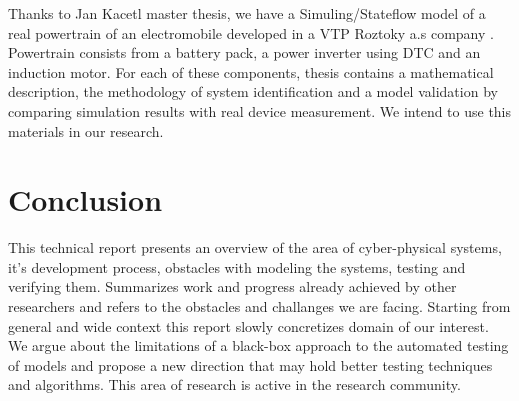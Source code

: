 \documentclass[english,technical,10pt]{FITreport}[2018/01/26]
\begin{document}
Thanks to Jan Kacetl master thesis, we have a Simuling/Stateflow model of a real powertrain of an electromobile developed in a VTP Roztoky a.s company \cite{Kacetl:2016}. Powertrain consists from a battery pack, a power inverter using DTC and an induction motor. For each of these components, thesis contains a mathematical description, the methodology of system identification and a model validation by comparing simulation results with real device measurement. We intend to use this materials in our research.

\section{Conclusion}

This technical report presents an overview of the area of cyber-physical systems, it's development process, obstacles with modeling the systems, testing and verifying them. Summarizes work and progress already achieved by other researchers and refers to the obstacles and challanges we are facing. Starting from general and wide context this report slowly concretizes domain of our interest. We argue about the limitations of a black-box approach to the automated testing of models and propose a new direction that may hold better testing techniques and algorithms. This area of research is active in the research community.



    
\end{document}
